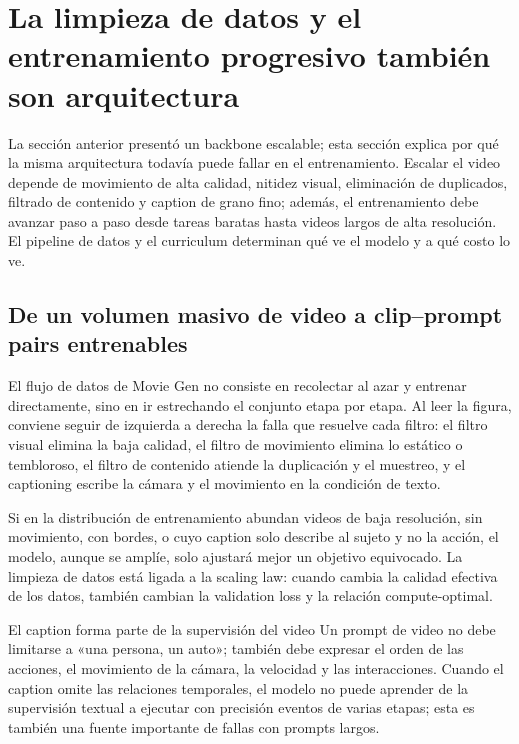 \section{La limpieza de datos y el entrenamiento progresivo también son arquitectura}

La sección anterior presentó un backbone escalable; esta sección explica por qué la misma arquitectura todavía puede fallar en el entrenamiento. Escalar el video depende de movimiento de alta calidad, nitidez visual, eliminación de duplicados, filtrado de contenido y caption de grano fino; además, el entrenamiento debe avanzar paso a paso desde tareas baratas hasta videos largos de alta resolución. El pipeline de datos y el curriculum determinan qué ve el modelo y a qué costo lo ve.

\subsection{De un volumen masivo de video a clip--prompt pairs entrenables}

El flujo de datos de Movie Gen no consiste en recolectar al azar y entrenar directamente, sino en ir estrechando el conjunto etapa por etapa. Al leer la figura, conviene seguir de izquierda a derecha la falla que resuelve cada filtro: el filtro visual elimina la baja calidad, el filtro de movimiento elimina lo estático o tembloroso, el filtro de contenido atiende la duplicación y el muestreo, y el captioning escribe la cámara y el movimiento en la condición de texto.


Si en la distribución de entrenamiento abundan videos de baja resolución, sin movimiento, con bordes, o cuyo caption solo describe al sujeto y no la acción, el modelo, aunque se amplíe, solo ajustará mejor un objetivo equivocado. La limpieza de datos está ligada a la scaling law: cuando cambia la calidad efectiva de los datos, también cambian la validation loss y la relación compute-optimal.

\begin{importantbox}{El caption forma parte de la supervisión del video}
Un prompt de video no debe limitarse a «una persona, un auto»; también debe expresar el orden de las acciones, el movimiento de la cámara, la velocidad y las interacciones. Cuando el caption omite las relaciones temporales, el modelo no puede aprender de la supervisión textual a ejecutar con precisión eventos de varias etapas; esta es también una fuente importante de fallas con prompts largos.
\end{importantbox}

